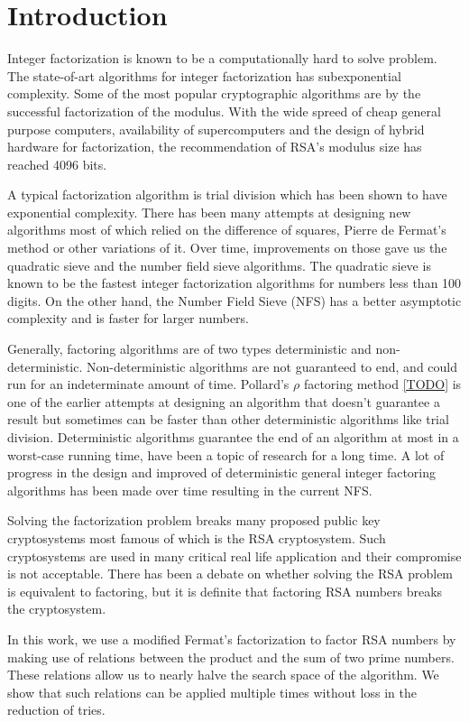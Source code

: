 \documentclass{article}
\begin{document}
\section{Introduction}
	Integer factorization is known to be a computationally hard to solve problem. The state-of-art algorithms for integer factorization has subexponential complexity. Some of the most popular cryptographic algorithms are by the successful factorization of the modulus. With the wide spreed of cheap general purpose computers, availability of supercomputers and the design of hybrid hardware for factorization, the recommendation of RSA's modulus size has reached 4096 bits. 

	A typical factorization algorithm is trial division which has been shown to have exponential complexity. There has been many attempts at designing new algorithms most of which relied on the difference of squares, Pierre de Fermat's method or other variations of it. Over time, improvements on those gave us the quadratic sieve and the number field sieve algorithms. The quadratic sieve is known to be the fastest integer factorization algorithms for numbers less than 100 digits. On the other hand, the Number Field Sieve (NFS) has a better asymptotic complexity and is faster for larger numbers.

	Generally, factoring algorithms are of two types deterministic and non-deterministic. Non-deterministic algorithms are not guaranteed to end, and could run for an indeterminate amount of time. Pollard's $\rho$ factoring method \ref{TODO} is one of the earlier attempts at designing an algorithm that doesn't guarantee a result but sometimes can be faster than other deterministic algorithms like trial division.  Deterministic algorithms guarantee the end of an algorithm at most in a worst-case running time, have been a topic of research for a long time. A lot of progress in the design and improved of deterministic general integer factoring algorithms has been made over time resulting in the current NFS.   

	Solving the factorization problem breaks many proposed public key cryptosystems most famous of which is the RSA cryptosystem. Such cryptosystems are used in many critical real life application and their compromise is not acceptable. There has been a debate on whether solving the RSA problem is equivalent to factoring, but it is definite that factoring RSA numbers breaks the cryptosystem.

	In this work, we use a modified Fermat's factorization to factor RSA numbers by making use of relations between the product and the sum of two prime numbers. These relations allow us to nearly halve the search space of the algorithm. We show that such relations can be applied multiple times without loss in the reduction of tries. 
	
\end{document}
